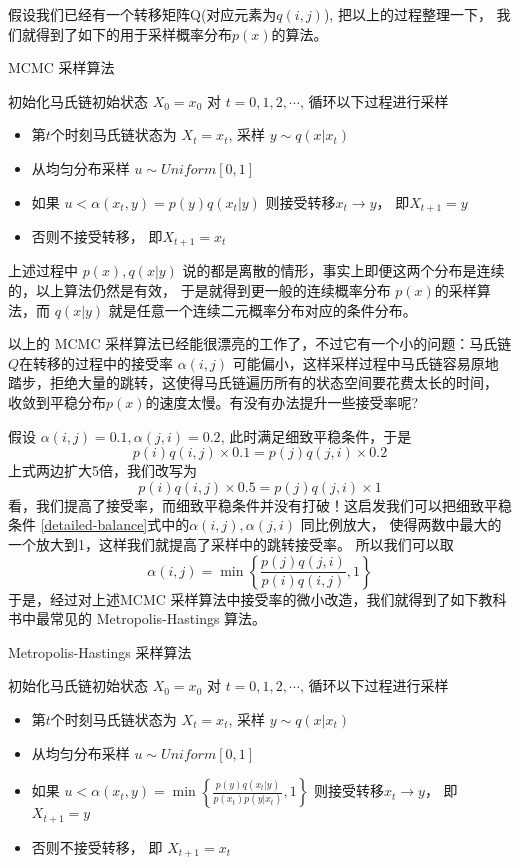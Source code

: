 假设我们已经有一个转移矩阵Q(对应元素为$q(i,j)$), 把以上的过程整理一下，
我们就得到了如下的用于采样概率分布$p(x)$的算法。
\begin{algorithm}[h]
\caption{MCMC 采样算法}
\begin{algorithmic}[1]
\STATE 初始化马氏链初始状态 $X_0 = x_0$
\STATE 对 $t=0,1,2,\cdots$, 循环以下过程进行采样
\begin{itemize}
\item 第$t$个时刻马氏链状态为 $X_t=x_t$, 采样 $y \sim q(x|x_t)$
\item 从均匀分布采样 $u \sim Uniform[0,1]$
\item 如果 $u < \alpha(x_t,y) = p(y)q(x_t|y)$ 则接受转移$x_t\rightarrow y$， 即$X_{t+1} = y$
\item 否则不接受转移， 即$X_{t+1} = x_t$
\end{itemize}
\end{algorithmic}
\end{algorithm}

上述过程中 $p(x),q(x|y)$ 说的都是离散的情形，事实上即便这两个分布是连续的，以上算法仍然是有效，
于是就得到更一般的连续概率分布 $p(x)$的采样算法，而 $q(x|y)$ 就是任意一个连续二元概率分布对应的条件分布。

以上的 MCMC 采样算法已经能很漂亮的工作了，不过它有一个小的问题：马氏链$Q$在转移的过程中的接受率 $\alpha(i,j)$
可能偏小，这样采样过程中马氏链容易原地踏步，拒绝大量的跳转，这使得马氏链遍历所有的状态空间要花费太长的时间，
收敛到平稳分布$p(x)$的速度太慢。有没有办法提升一些接受率呢?

假设 $\alpha(i,j)=0.1, \alpha(j,i)=0.2$, 此时满足细致平稳条件，于是
$$ p(i)q(i,j)\times 0.1 = p(j)q(j,i) \times 0.2 $$
上式两边扩大5倍，我们改写为
$$ p(i)q(i,j) \times 0.5 = p(j)q(j,i) \times 1 $$
看，我们提高了接受率，而细致平稳条件并没有打破！这启发我们可以把细致平稳条件
\eqref{detailed-balance}式中的$\alpha(i,j),\alpha(j,i)$ 同比例放大，
使得两数中最大的一个放大到1，这样我们就提高了采样中的跳转接受率。
所以我们可以取
$$ \alpha(i,j) = \min\left\{\frac{p(j)q(j,i)}{p(i)q(i,j)},1\right\} $$
于是，经过对上述MCMC 采样算法中接受率的微小改造，我们就得到了如下教科书中最常见的 Metropolis-Hastings 算法。
\begin{algorithm}[htb]
\caption{Metropolis-Hastings 采样算法}
\begin{algorithmic}[1]
\STATE 初始化马氏链初始状态 $X_0 = x_0$
\STATE 对 $t=0,1,2,\cdots$, 循环以下过程进行采样
\begin{itemize}
\item 第$t$个时刻马氏链状态为 $X_t=x_t$, 采样 $y \sim q(x|x_t)$
\item 从均匀分布采样 $u \sim Uniform[0,1]$
\item 如果 $u < \alpha(x_t,y) = \min\left\{\frac{p(y)q(x_t|y)}{p(x_t)p(y|x_t)},1\right\}$
      则接受转移$x_t\rightarrow y$， 即 $X_{t+1} = y$
\item 否则不接受转移， 即 $X_{t+1} = x_t$
\end{itemize}
\end{algorithmic}
\end{algorithm}

